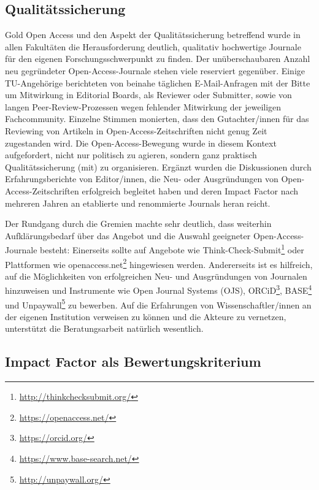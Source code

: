 \documentclass[a4paper,
fontsize=11pt,
oneside,
numbers=noperiodatend,
parskip=half-,
bibliography=totoc,
final
]{scrartcl}
\begin{document}
\hypertarget{qualituxe4tssicherung}{%
\subsection*{Qualitätssicherung}\label{qualituxe4tssicherung}}

Gold Open Access und den Aspekt der Qualitätssicherung betreffend wurde
in allen Fakultäten die Herausforderung deutlich, qualitativ hochwertige
Journale für den eigenen Forschungsschwerpunkt zu finden. Der
unüberschaubaren Anzahl neu gegründeter Open-Access-Journale stehen
viele reserviert gegenüber. Einige TU-Angehörige berichteten von beinahe
täglichen E-Mail-Anfragen mit der Bitte um Mitwirkung in Editorial
Boards, als Reviewer oder Submitter, sowie von langen
Peer-Review-Prozessen wegen fehlender Mitwirkung der jeweiligen
Fachcommunity. Einzelne Stimmen monierten, dass den Gutachter/innen für
das Reviewing von Artikeln in Open-Access-Zeit\-schrif\-ten nicht genug Zeit
zugestanden wird. Die Open-Access-Bewegung wurde in diesem Kontext
aufgefordert, nicht nur politisch zu agieren, sondern ganz praktisch
Qualitätssicherung (mit) zu organisieren. Ergänzt wurden die
Diskussionen durch Erfahrungsberichte von Editor/innen, die Neu- oder
Ausgründungen von Open-Access-Zeit\-schrif\-ten erfolgreich begleitet haben
und deren Impact Factor nach mehreren Jahren an etablierte und
renommierte Journals heran reicht.

Der Rundgang durch die Gremien machte sehr deutlich, dass weiterhin
Aufklärungsbedarf über das Angebot und die Auswahl geeigneter
Open-Access-Journale besteht: Einerseits sollte auf Angebote wie
Think-Check-Submit\footnote{\url{http://thinkchecksubmit.org/}} oder
Plattformen wie openaccess.net\footnote{\url{https://openaccess.net/}}
hingewiesen werden. Andererseits ist es hilfreich, auf die Möglichkeiten
von erfolgreichen Neu- und Ausgründungen von Journalen hinzuweisen und
Instrumente wie Open Journal Systems (OJS), ORCiD\footnote{\url{https://orcid.org/}},
BASE\footnote{\url{https://www.base-search.net/}} und
Unpaywall\footnote{\url{http://unpaywall.org/}} zu bewerben. Auf die
Erfahrungen von Wissenschaftler/innen an der eigenen Institution
verweisen zu können und die Akteure zu vernetzen, unterstützt die
Beratungsarbeit natürlich wesentlich.

\hypertarget{impact-factor-als-bewertungskriterium}{%
\subsection*{Impact Factor als
Bewertungskriterium}\label{impact-factor-als-bewertungskriterium}}
\end{document}
